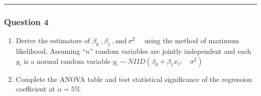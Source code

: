 \documentclass[
]{article}
\begin{document}
\begin{center}\rule{0.5\linewidth}{0.5pt}\end{center}

\subsubsection{Question 4}\label{question-4}

\begin{enumerate}
\def\labelenumi{\alph{enumi}.}
\item
  Derive the estimators of
  \(\beta_0 \ ,\beta_1 \  , \text{and} \ \sigma^2 \quad\) using the
  method of maximum likelihood. Assuming ``\(n\)'' random variables are
  jointly independent and each \(y_i\) is a normal random variable
  \(y_i \sim NIID(\beta_0 + \beta_1 x_i; \quad \sigma^2)\)
\item
  Complete the ANOVA table and test statistical significance of the
  regression coefficient at \(\alpha = 5\%\)
\end{enumerate}
\end{document}

